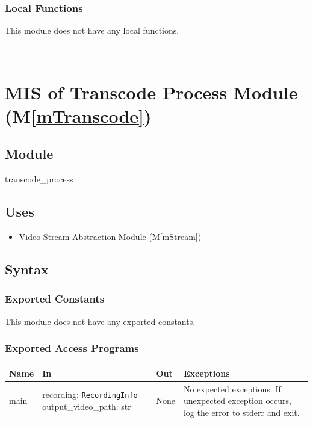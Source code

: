 \documentclass[12pt, titlepage]{article}
\newcommand{\mref}[1]{M\ref{#1}}
\begin{document}
\subsubsection{Local Functions}

This module does not have any local functions.

\ \

\section{MIS of Transcode Process Module (\mref{mTranscode})}

\subsection{Module}

transcode\_process

\subsection{Uses}

\begin{itemize}
  \item Video Stream Abstraction Module (\mref{mStream})
\end{itemize}

\subsection{Syntax}

\subsubsection{Exported Constants}

This module does not have any exported constants.

\subsubsection{Exported Access Programs}

\begin{center}
  \begin{tabular}{p{3cm} p{5cm} p{3cm} p{3.5cm}}
    \hline
    \textbf{Name} & \textbf{In}                                                         & \textbf{Out} & \textbf{Exceptions}                                                                       \\
    \hline
    main          & recording: \texttt{RecordingInfo} \newline output\_video\_path: str & None         & No expected exceptions. If unexpected exception occurs, log the error to stderr and exit. \\
    \hline
  \end{tabular}
\end{center}
\end{document}
